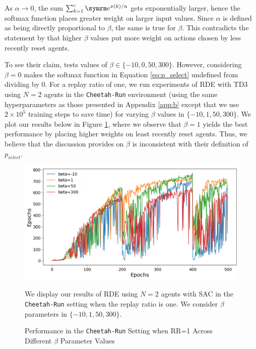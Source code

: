 \documentclass[base]{subfiles}
\begin{document}
As $\alpha \rightarrow 0$, the sum $\sum_{k=1}^c \e^{x(k) / \alpha}$ gets exponentially larger, hence the softmax function places greater weight on larger input values.
Since $\alpha$ is defined as being directly proportional to $\beta$, the same is true for $\beta$.
This contradicts the statement by \cite{kim2023} that higher $\beta$ values put more weight on actions chosen by less recently reset agents.

To see their claim, \cite{kim2023} tests values of $\beta \in \{-10, 0, 50, 300 \}$. 
However, considering $\beta=0$ makes the softmax function in Equation \ref{eq:p_select} undefined from dividing by $0$. 
For a replay ratio of one, we run experiments of RDE with TD3 using $N=2$ agents in the \texttt{Cheetah-Run} environment (using the same hyperparameters as those presented in Appendix \ref{app:b} except that we use $2 \times 10^5$ training steps to save time) for varying $\beta$ values in $\{-10, 1, 50, 300\}$. 
We plot our results below in Figure \ref{fig:beta_test}, where we observe that $\beta=1$ yields the best performance by placing higher weights on least recently reset agents.
Thus, we believe that the discussion \cite{kim2023} provides on $\beta$ is inconsistent with their definition of $p_{select}$.

\begin{figure}[h!]
    \centering
    \caption{Performance in the \texttt{Cheetah-Run} Setting when RR=1 Across Different $\beta$ Parameter Values}
    \label{fig:beta_test}
    \includegraphics[width = 1 \linewidth]{beta_test.png}
    \begin{flushleft} We display our results of RDE using $N=2$ agents with SAC in the \texttt{Cheetah-Run} setting when the replay ratio is one. We consider $\beta$ parameters in $\{ -10, 1, 50, 300 \}$.  \end{flushleft}
\end{figure}
\end{document}
